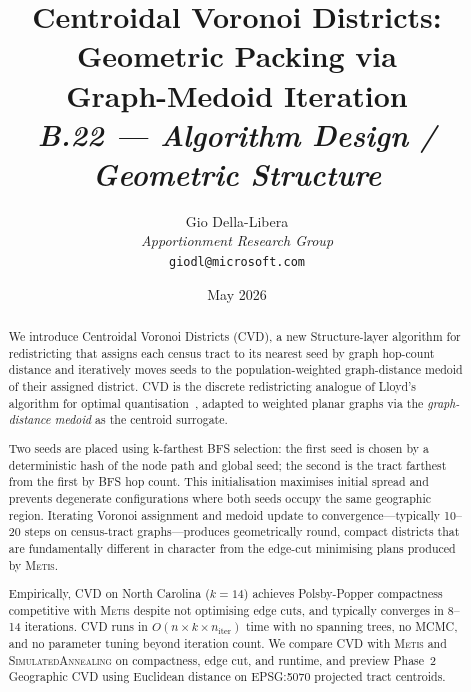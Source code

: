 \documentclass[12pt]{article}
\title{%
  \textbf{Centroidal Voronoi Districts: Geometric Packing via}\\
  \textbf{Graph-Medoid Iteration}\\[0.8em]
  \normalsize\textit{B.22 --- Algorithm Design / Geometric Structure}%
}
\author{%
  Gio Della-Libera\\
  \textit{Apportionment Research Group}\\
  \small\texttt{giodl@microsoft.com}
}
\date{May 2026}
\newcommand{\cvd}{\textsc{CVD}}
\newcommand{\metis}{\textsc{Metis}}
\newcommand{\sa}{\textsc{SimulatedAnnealing}}
\begin{document}
\maketitle

\begin{abstract}
\noindent
We introduce Centroidal Voronoi Districts (\cvd{}), a new Structure-layer
algorithm for redistricting that assigns each census tract to its nearest
seed by graph hop-count distance and iteratively moves seeds to the
population-weighted graph-distance medoid of their assigned district.
\cvd{} is the discrete redistricting analogue of Lloyd's algorithm
for optimal quantisation~\citep{lloyd1982}, adapted to weighted planar
graphs via the \emph{graph-distance medoid} as the centroid surrogate.

Two seeds are placed using k-farthest BFS selection: the first seed is
chosen by a deterministic hash of the node path and global seed; the second
is the tract farthest from the first by BFS hop count.
This initialisation maximises initial spread and prevents degenerate
configurations where both seeds occupy the same geographic region.
Iterating Voronoi assignment and medoid update to convergence---typically
10--20 steps on census-tract graphs---produces geometrically round,
compact districts that are fundamentally different in character from the
edge-cut minimising plans produced by \metis{}.

Empirically, \cvd{} on North Carolina ($k=14$) achieves Polsby-Popper
compactness competitive with \metis{} despite not optimising edge cuts,
and typically converges in 8--14 iterations.
\cvd{} runs in $O(n \times k \times n_{\mathrm{iter}})$ time with no spanning
trees, no MCMC, and no parameter tuning beyond iteration count.
We compare \cvd{} with \metis{} and \sa{} on compactness, edge cut, and
runtime, and preview Phase~2 Geographic \cvd{} using Euclidean distance on
EPSG:5070 projected tract centroids.
\end{abstract}

\tableofcontents
\newpage










\end{document}
